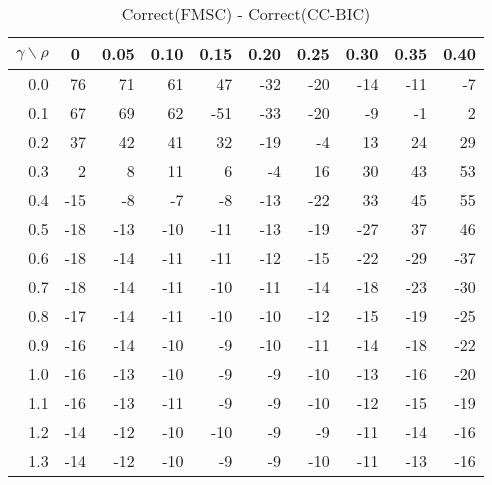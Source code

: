 \documentclass[12pt]{article}
\begin{document}
%
\begin{table}[!tbp]
\caption{Correct(FMSC) - Correct(CC-BIC)}
 \begin{center}
 \begin{tabular}{r|rrrrrrrrr}\hline\hline
\multicolumn{1}{c|}{$\gamma\backslash\rho$}&\multicolumn{1}{c}{0}&\multicolumn{1}{c}{0.05}&\multicolumn{1}{c}{0.10}&\multicolumn{1}{c}{0.15}&\multicolumn{1}{c}{0.20}&\multicolumn{1}{c}{0.25}&\multicolumn{1}{c}{0.30}&\multicolumn{1}{c}{0.35}&\multicolumn{1}{c}{0.40}\tabularnewline
\hline



0.0& 76& 71& 61& 47&-32&-20&-14&-11& -7\tabularnewline
0.1& 67& 69& 62&-51&-33&-20& -9& -1&  2\tabularnewline
0.2& 37& 42& 41& 32&-19& -4& 13& 24& 29\tabularnewline
0.3&  2&  8& 11&  6& -4& 16& 30& 43& 53\tabularnewline
0.4&-15& -8& -7& -8&-13&-22& 33& 45& 55\tabularnewline
0.5&-18&-13&-10&-11&-13&-19&-27& 37& 46\tabularnewline
0.6&-18&-14&-11&-11&-12&-15&-22&-29&-37\tabularnewline
0.7&-18&-14&-11&-10&-11&-14&-18&-23&-30\tabularnewline
0.8&-17&-14&-11&-10&-10&-12&-15&-19&-25\tabularnewline
0.9&-16&-14&-10& -9&-10&-11&-14&-18&-22\tabularnewline
1.0&-16&-13&-10& -9& -9&-10&-13&-16&-20\tabularnewline
1.1&-16&-13&-11& -9& -9&-10&-12&-15&-19\tabularnewline
1.2&-14&-12&-10&-10& -9& -9&-11&-14&-16\tabularnewline
1.3&-14&-12&-10& -9& -9&-10&-11&-13&-16\tabularnewline
\hline
\end{tabular}

\end{center}

\end{table}
\end{document}
